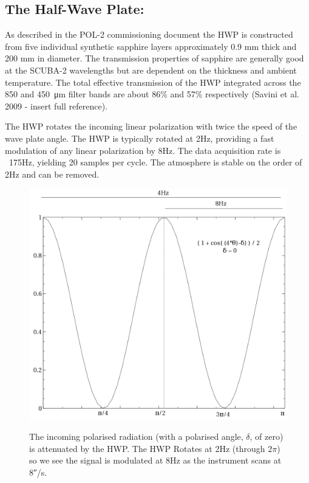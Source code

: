 \subsection*{The Half-Wave Plate:}

As described in the POL-2 commissioning document
the HWP is constructed from five individual synthetic sapphire layers approximately 0.9
mm thick and 200 mm in diameter. The transmission properties of sapphire
are generally good at the SCUBA-2 wavelengths but are dependent on the thickness and ambient
temperature. The total effective transmission of the HWP integrated across the 850
and \SI{450}{\micro\metre} filter bands are about 86\% and 57\% respectively
(Savini et al. 2009 - insert full reference).

The HWP rotates the incoming linear polarization with twice the speed of the wave plate angle. 
The HWP is typically rotated at 2Hz, providing a fast modulation of any linear polarization by 8Hz.
The data acquisition rate is ~175Hz, yielding 20 samples per cycle.
The atmosphere is stable on the order of 2Hz and can be removed.


\begin{figure}[t!]
\begin{center}
\includegraphics[width=0.7\linewidth]{hwp-modulation.png}
\label{fig:hwpmodulation}
\caption [Attenuation of signal by HWP]{
  \small The incoming polarised radiation (with a  polarised angle, $\delta$, of zero) is attenuated by the HWP.
The HWP Rotates at 2Hz (through $2\pi$) so we see the signal is modulated at 8Hz as the instrument 
scans at 8\si{\arcsecond}/s.
}
\end{center}
\end{figure}


